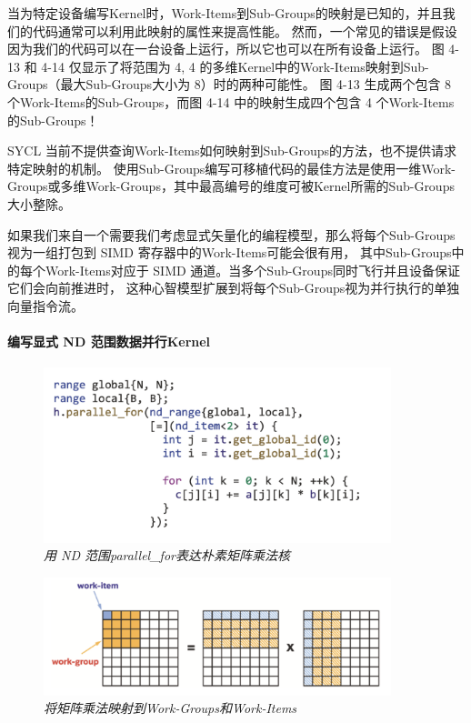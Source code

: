 当为特定设备编写Kernel时，Work-Items到Sub-Groups的映射是已知的，并且我们的代码通常可以利用此映射的属性来提高性能。 
然而，一个常见的错误是假设因为我们的代码可以在一台设备上运行，所以它也可以在所有设备上运行。 
图 4-13 和 4-14 仅显示了将范围为 {4, 4} 的多维Kernel中的Work-Items映射到Sub-Groups（最大Sub-Groups大小为 8）时的两种可能性。 
图 4-13 生成两个包含 8 个Work-Items的Sub-Groups，而图 4-14 中的映射生成四个包含 4 个Work-Items的Sub-Groups！

SYCL 当前不提供查询Work-Items如何映射到Sub-Groups的方法，也不提供请求特定映射的机制。 
使用Sub-Groups编写可移植代码的最佳方法是使用一维Work-Groups或多维Work-Groups，其中最高编号的维度可被Kernel所需的Sub-Groups大小整除。

\begin{remark}
	如果我们来自一个需要我们考虑显式矢量化的编程模型，那么将每个Sub-Groups视为一组打包到 SIMD 寄存器中的Work-Items可能会很有用，
	其中Sub-Groups中的每个Work-Items对应于 SIMD 通道。当多个Sub-Groups同时飞行并且设备保证它们会向前推进时，
	这种心智模型扩展到将每个Sub-Groups视为并行执行的单独向量指令流。
\end{remark}

\paragraph{编写显式 ND 范围数据并行Kernel}

\begin{figure}[H]
	\centering
	\includegraphics[width=0.9\textwidth]{figs/F4.15.png}
	\caption{\textit{用 ND 范围parallel\_for表达朴素矩阵乘法核}}
\end{figure}

\begin{figure}[H]
	\centering
	\includegraphics[width=0.9\textwidth]{figs/F4.16.png}
	\caption{\textit{将矩阵乘法映射到Work-Groups和Work-Items}}
\end{figure}

